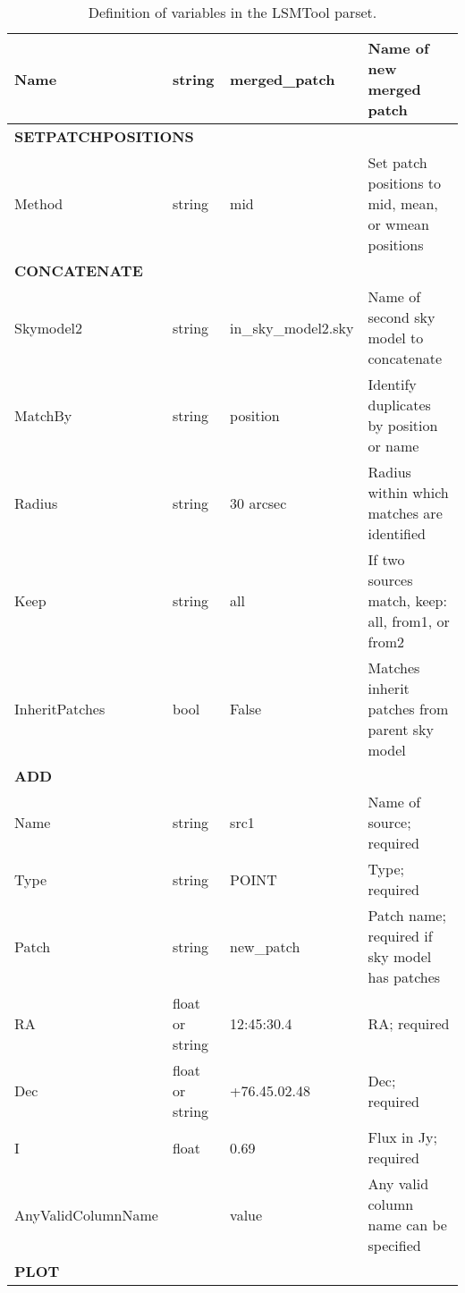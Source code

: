 \documentclass[structabstract]{article}
\begin{document}
\begin{table}[!ht]
\begin{tabular}{l l l l}
Name & string & merged\_patch & Name of new merged patch\\
\hline
\multicolumn{4}{l}{\textbf{SETPATCHPOSITIONS}}\\
Method & string & mid & Set patch positions to mid, mean, or wmean positions\\
\hline
\multicolumn{4}{l}{\textbf{CONCATENATE}}\\
Skymodel2 & string & in\_sky\_model2.sky & Name of second sky model to concatenate\\
MatchBy & string & position & Identify duplicates by position or name\\
Radius & string & 30 arcsec & Radius within which matches are identified\\
Keep & string & all & If two sources match, keep: all, from1, or from2\\
InheritPatches & bool & False & Matches inherit patches from parent sky model\\
\hline
\multicolumn{4}{l}{\textbf{ADD}}\\
Name & string & src1 & Name of source; required\\
Type & string & POINT & Type; required\\
Patch & string & new\_patch & Patch name; required if sky model has patches\\
RA & float or string & 12:45:30.4 & RA; required\\
Dec & float or string & +76.45.02.48 & Dec; required\\
I & float & 0.69 & Flux in Jy; required\\
AnyValidColumnName & & value & Any valid column name can be specified\\
\hline
\multicolumn{4}{l}{\textbf{PLOT}}\\
\hline

\end{tabular}
\caption{Definition of variables in the LSMTool parset. \label{lsmtool:tab:local_val}}
\end{table}

\end{document}
